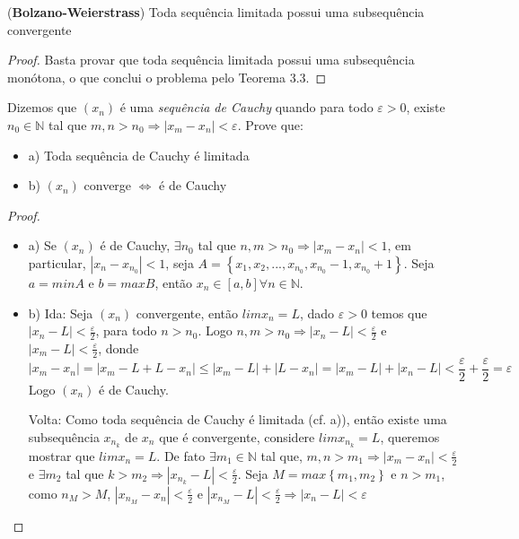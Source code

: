 \begin{corol}(\textbf{Bolzano-Weierstrass})
Toda sequência limitada possui uma subsequência convergente
\end{corol}
\begin{proof}
Basta provar que toda sequência limitada possui uma subsequência monótona, o que conclui o problema pelo Teorema 3.3. %
\end{proof}
\begin{prob}
Dizemos que $(x_{n})$ é uma \textit{sequência de Cauchy} quando para todo $\varepsilon >0$, existe $n_{0} \in \mathbb{N}$ tal que $m,n > n_{0} \Rightarrow |x_{m}-x_{n}|< \varepsilon$. Prove que:
\begin{itemize}
    \item a) Toda sequência de Cauchy é limitada
    \item b) $(x_{n})$ converge $\Leftrightarrow$ é de Cauchy
\end{itemize}
\end{prob}
\begin{proof}
\begin{itemize}
    \item a) Se $(x_{n})$ é de Cauchy, $\exists n_{0}$ tal que $n,m> n_{0} \Rightarrow |x_{m}-x_{n}|<1$, em particular, $|x_{n}-x_{n_{0}}|<1$, seja $A=\left \{ x_{1},x_{2},...,x_{n_{0}},x_{n_{0}}-1,x_{n_{0}}+1 \right \}$. Seja $a=minA$ e $b=maxB$, então $x_{n} \in [a,b] \forall n \in \mathbb{N}$.
    \item b) Ida: Seja $(x_{n})$ convergente, então $limx_{n}=L$, dado $\varepsilon>0$ temos que $|x_{n}-L|< \frac{\varepsilon}{2}$, para todo $n > n_{0}$. Logo $n,m > n_{0} \Rightarrow |x_{n}-L|< \frac{\varepsilon}{2}$ e $|x_{m}-L|< \frac{\varepsilon}{2}$, donde $$|x_{m}-x_{n}|=|x_{m}-L+L-x_{n}| \leq |x_{m}-L|+|L-x_{n}|=|x_{m}-L|+|x_{n}-L| < \frac{\varepsilon}{2} + \frac{\varepsilon}{2} = \varepsilon $$
    Logo $(x_{n})$ é de Cauchy.
    
    Volta: Como toda sequência de Cauchy é limitada (cf. a)), então existe uma subsequência $x_{n_{k}}$ de $x_{n}$ que é convergente, considere $limx_{n_{k}}=L$, queremos mostrar que $limx_{n}=L$. De fato $\exists m_{1}\in \mathbb{N}$ tal que, $m,n > m_{1} \Rightarrow |x_{m}-x_{n}|< \frac{\varepsilon}{2}$ e $\exists m_{2}$ tal que $k>m_{2}\Rightarrow |x_{n_{k}}-L|< \frac{\varepsilon}{2}$. Seja $M=max\left \{ m_{1},m_{2} \right \}$ e $n>m_{1}$, como $n_{M}>M$, $|x_{n_{M}}-x_{n}|<\frac{\varepsilon}{2}$ e $|x_{n_{M}}-L|< \frac{\varepsilon}{2}\Rightarrow |x_{n}-L|< \varepsilon$
\end{itemize}
\end{proof}

